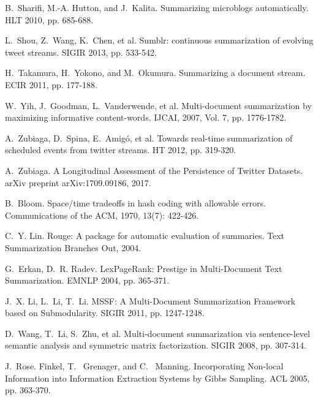\documentclass[envcountsame]{llncs}
\begin{document}
\begin{thebibliography}{10}
B.~Sharifi, M.-A. Hutton, and J.~Kalita.
\newblock Summarizing microblogs automatically.
\newblock HLT 2010, pp. 685-688.

L.~Shou, Z.~Wang, K.~Chen, et al.
\newblock Sumblr: continuous summarization of evolving tweet streams.
\newblock SIGIR 2013, pp. 533-542.

H.~Takamura, H.~Yokono, and M.~Okumura.
\newblock Summarizing a document stream.
\newblock ECIR 2011, pp. 177-188.

W.~Yih, J.~Goodman, L.~Vanderwende, et al.
\newblock Multi-document summarization by maximizing informative content-words.
\newblock IJCAI, 2007, Vol. 7, pp. 1776-1782.

A.~Zubiaga, D.~Spina, E.~Amig\'{o}, et al.
\newblock Towards real-time summarization of scheduled events from twitter streams.
\newblock HT 2012, pp. 319-320.

A.~Zubiaga.
\newblock A Longitudinal Assessment of the Persistence of Twitter Datasets.
\newblock arXiv preprint arXiv:1709.09186, 2017.

B.~Bloom.
\newblock Space/time tradeoffs in hash coding with allowable errors.
\newblock Communications of the ACM, 1970, 13(7): 422-426.

C.~Y. Lin.
\newblock Rouge: A package for automatic evaluation of summaries.
\newblock Text Summarization Branches Out, 2004.

G.~Erkan, D.~R. Radev.
\newblock LexPageRank: Prestige in Multi-Document Text Summarization.
\newblock EMNLP 2004, pp. 365-371.

J.~X. Li, L.~Li, T.~Li.
\newblock MSSF: A Multi-Document Summarization Framework based on Submodularity.
\newblock  SIGIR 2011, pp. 1247-1248.

D.~Wang, T.~Li, S.~Zhu, et al.
\newblock Multi-document summarization via sentence-level semantic analysis and symmetric matrix factorization.
\newblock SIGIR 2008, pp. 307-314.

J.~Rose. Finkel, T.~ Grenager, and C.~ Manning.
\newblock Incorporating Non-local Information into Information Extraction Systems by Gibbs Sampling.
\newblock ACL 2005, pp. 363-370.

\end{thebibliography}
\end{document}
